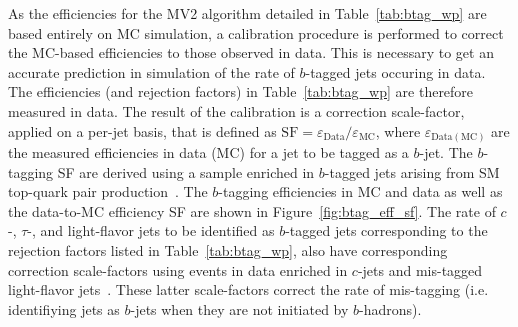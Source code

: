 As the efficiencies for the MV2 algorithm detailed in Table~\ref{tab:btag_wp} are based entirely
on MC simulation, a calibration procedure is performed to correct the MC-based efficiencies to
those observed in data.
This is necessary to get an accurate prediction in simulation of the rate of $b$-tagged jets occuring in data.
The efficiencies (and rejection factors) in Table~\ref{tab:btag_wp} are therefore measured in
data.
The result of the calibration is a correction scale-factor, applied on a per-jet basis, that is defined as
$\text{SF} = \varepsilon_{\text{Data}} / \varepsilon_{\text{MC}}$, where $\varepsilon_{\text{Data}(\text{MC})}$
are the measured efficiencies in data (MC) for a jet to be tagged as a $b$-jet.
The $b$-tagging SF are derived using a sample enriched in $b$-tagged jets arising from SM top-quark pair production~\cite{FTAG2019}.
The $b$-tagging efficiencies in MC and data as well as the data-to-MC efficiency SF are shown in Figure~\ref{fig:btag_eff_sf}.
The rate of $c$-, $\tau$-, and light-flavor jets to be identified as $b$-tagged jets corresponding to the rejection factors
listed in Table~\ref{tab:btag_wp}, also have corresponding correction scale-factors using events
in data enriched in $c$-jets and mis-tagged light-flavor jets~\cite{FTAG2019,FTAGCJetCalib,FTAGLightFlavorCalib}.
These latter scale-factors correct the rate of mis-tagging (i.e. identifiying jets as $b$-jets when they are
not initiated by $b$-hadrons).

